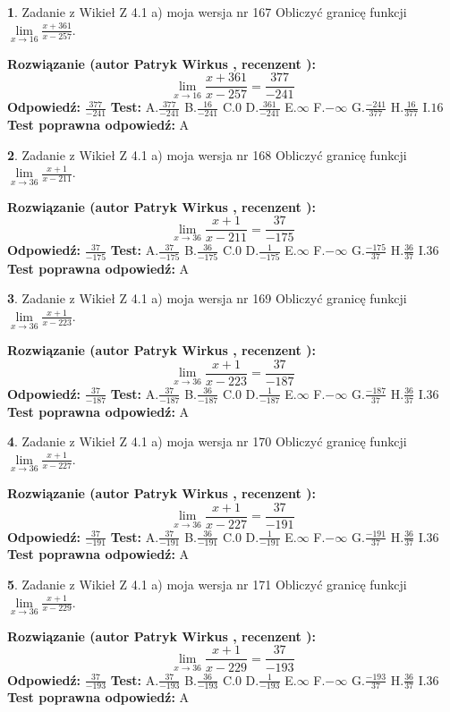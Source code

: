 \documentclass[12pt, a4paper]{article}
\theoremstyle{definition} %
\newtheorem{zad}{}
\newcommand{\zadStart}[1]{\begin{zad}#1\newline}
\newcommand{\zadStop}{\end{zad}}
\newcommand{\rozwStart}[2]{\noindent \textbf{Rozwiązanie (autor #1 , recenzent #2): }\newline}
\newcommand{\rozwStop}{\newline}
\newcommand{\odpStart}{\noindent \textbf{Odpowiedź:}\newline}
\newcommand{\odpStop}{\newline}
\newcommand{\testStart}{\noindent \textbf{Test:}\newline}
\newcommand{\testStop}{\newline}
\newcommand{\kluczStart}{\noindent \textbf{Test poprawna odpowiedź:}\newline}
\newcommand{\kluczStop}{\newline}
\begin{document}
\zadStart{Zadanie z Wikieł Z 4.1 a) moja wersja nr 167}
Obliczyć granicę funkcji $\lim\limits_{x\to16}\frac{x+361}{x-257}$.
\zadStop
\rozwStart{Patryk Wirkus}{}
$$\lim\limits_{x\to16}\frac{x+361}{x-257} = \frac{377}{-241}$$
\rozwStop
\odpStart
$\frac{377}{-241}$
\odpStop
\testStart
A.$\frac{377}{-241}$
B.$\frac{16}{-241}$
C.$0$
D.$\frac{361}{-241}$
E.$\infty$
F.$-\infty$
G.$\frac{-241}{377}$
H.$\frac{16}{377}$
I.$16$
\testStop
\kluczStart
A
\kluczStop



\zadStart{Zadanie z Wikieł Z 4.1 a) moja wersja nr 168}
Obliczyć granicę funkcji $\lim\limits_{x\to36}\frac{x+1}{x-211}$.
\zadStop
\rozwStart{Patryk Wirkus}{}
$$\lim\limits_{x\to36}\frac{x+1}{x-211} = \frac{37}{-175}$$
\rozwStop
\odpStart
$\frac{37}{-175}$
\odpStop
\testStart
A.$\frac{37}{-175}$
B.$\frac{36}{-175}$
C.$0$
D.$\frac{1}{-175}$
E.$\infty$
F.$-\infty$
G.$\frac{-175}{37}$
H.$\frac{36}{37}$
I.$36$
\testStop
\kluczStart
A
\kluczStop



\zadStart{Zadanie z Wikieł Z 4.1 a) moja wersja nr 169}
Obliczyć granicę funkcji $\lim\limits_{x\to36}\frac{x+1}{x-223}$.
\zadStop
\rozwStart{Patryk Wirkus}{}
$$\lim\limits_{x\to36}\frac{x+1}{x-223} = \frac{37}{-187}$$
\rozwStop
\odpStart
$\frac{37}{-187}$
\odpStop
\testStart
A.$\frac{37}{-187}$
B.$\frac{36}{-187}$
C.$0$
D.$\frac{1}{-187}$
E.$\infty$
F.$-\infty$
G.$\frac{-187}{37}$
H.$\frac{36}{37}$
I.$36$
\testStop
\kluczStart
A
\kluczStop



\zadStart{Zadanie z Wikieł Z 4.1 a) moja wersja nr 170}
Obliczyć granicę funkcji $\lim\limits_{x\to36}\frac{x+1}{x-227}$.
\zadStop
\rozwStart{Patryk Wirkus}{}
$$\lim\limits_{x\to36}\frac{x+1}{x-227} = \frac{37}{-191}$$
\rozwStop
\odpStart
$\frac{37}{-191}$
\odpStop
\testStart
A.$\frac{37}{-191}$
B.$\frac{36}{-191}$
C.$0$
D.$\frac{1}{-191}$
E.$\infty$
F.$-\infty$
G.$\frac{-191}{37}$
H.$\frac{36}{37}$
I.$36$
\testStop
\kluczStart
A
\kluczStop



\zadStart{Zadanie z Wikieł Z 4.1 a) moja wersja nr 171}
Obliczyć granicę funkcji $\lim\limits_{x\to36}\frac{x+1}{x-229}$.
\zadStop
\rozwStart{Patryk Wirkus}{}
$$\lim\limits_{x\to36}\frac{x+1}{x-229} = \frac{37}{-193}$$
\rozwStop
\odpStart
$\frac{37}{-193}$
\odpStop
\testStart
A.$\frac{37}{-193}$
B.$\frac{36}{-193}$
C.$0$
D.$\frac{1}{-193}$
E.$\infty$
F.$-\infty$
G.$\frac{-193}{37}$
H.$\frac{36}{37}$
I.$36$
\testStop
\kluczStart
A
\kluczStop
\end{document}
